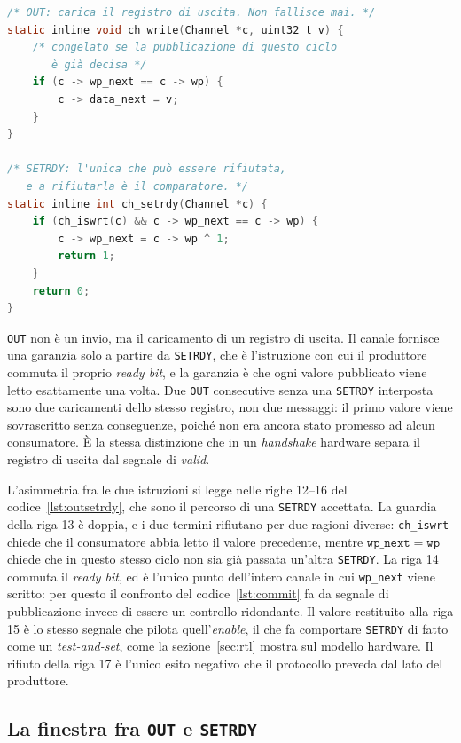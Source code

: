 \begin{lstlisting}[caption={Le due metà della pubblicazione nel simulatore},label={lst:outsetrdy},language=C,float=htbp]
/* OUT: carica il registro di uscita. Non fallisce mai. */
static inline void ch_write(Channel *c, uint32_t v) {
    /* congelato se la pubblicazione di questo ciclo
       è già decisa */
    if (c -> wp_next == c -> wp) {
        c -> data_next = v;
    }
}

/* SETRDY: l'unica che può essere rifiutata,
   e a rifiutarla è il comparatore. */
static inline int ch_setrdy(Channel *c) {
    if (ch_iswrt(c) && c -> wp_next == c -> wp) {
        c -> wp_next = c -> wp ^ 1;
        return 1;
    }
    return 0;
}
\end{lstlisting}


\texttt{OUT} non è un invio, ma il caricamento di un registro di
uscita. Il canale fornisce una garanzia solo a partire da \texttt{SETRDY}, che è
l'istruzione con cui il produttore commuta il proprio \emph{ready bit}, e la
garanzia è che ogni valore pubblicato viene letto esattamente una
volta. Due \texttt{OUT} consecutive senza una \texttt{SETRDY} interposta sono
due caricamenti dello stesso registro, non due messaggi: il primo valore viene
sovrascritto senza conseguenze, poiché non era ancora stato promesso ad alcun
consumatore. È la stessa distinzione che in un \emph{handshake}
hardware separa il registro di uscita dal segnale di \emph{valid}.

L'asimmetria fra le due istruzioni si legge nelle righe 12--16 del
codice~\ref{lst:outsetrdy}, che sono il percorso di una \texttt{SETRDY}
accettata. La
guardia della riga 13 è doppia, e i due termini rifiutano per due ragioni
diverse: \texttt{ch\_iswrt} chiede che il consumatore abbia letto il valore
precedente, mentre $\mathtt{wp\_next} = \mathtt{wp}$ chiede che in questo stesso
ciclo non sia già passata un'altra \texttt{SETRDY}. La riga 14 commuta il
\emph{ready bit}, ed è l'unico punto dell'intero canale in cui \texttt{wp\_next}
viene scritto: per questo il confronto del codice~\ref{lst:commit} fa da
segnale di pubblicazione invece di essere un controllo ridondante. Il
valore restituito alla riga 15 è lo stesso segnale che pilota quell'\emph{enable}, il che fa comportare \texttt{SETRDY} di fatto come un
\emph{test-and-set}, come la
sezione~\ref{sec:rtl} mostra sul modello hardware. Il rifiuto della riga 17 è
l'unico esito negativo che il protocollo preveda dal lato del produttore.

\subsection{La finestra fra \texttt{OUT} e \texttt{SETRDY}}
\label{sec:finestra}


